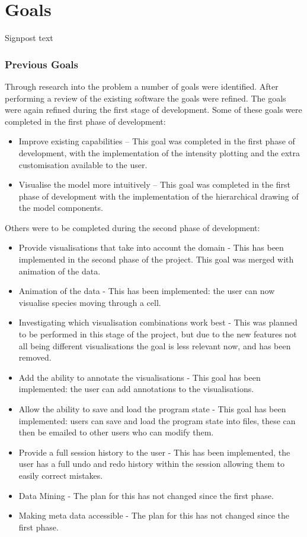\chapter{Goals}

Signpost text

\subsection{Previous Goals}
Through research into the problem a number of goals were identified.  After performing a review of the existing software the goals were refined.  The goals were again refined during the first stage of development.  Some of these goals were completed in the first phase of development:

\begin{itemize}
\item Improve existing capabilities -- This goal was completed in the first phase of development, with the implementation of the intensity plotting and the extra customisation available to the user.
\item Visualise the model more intuitively -- This goal was completed in the first phase of development with the implementation of the hierarchical drawing of the model components.
\end{itemize}

Others were to be completed during the second phase of development:

\begin{itemize}
\item Provide visualisations that take into account the domain - This has been implemented in the second phase of the project.  This goal was merged with animation of the data.
\item Animation of the data - This has been implemented: the user can now visualise species moving through a cell.
\item Investigating which visualisation combinations work best - This was planned to be performed in this stage of the project, but due to the new features not all being different visualisations the goal is less relevant now, and has been removed.
\item Add the ability to annotate the visualisations - This goal has been implemented: the user can add annotations to the visualisations.
\item Allow the ability to save and load the program state - This goal has been implemented: users can save and load the program state into files, these can then be emailed to other users who can modify them.
\item Provide a full session history to the user - This has been implemented, the user has a full undo and redo history within the session allowing them to easily correct mistakes.
\item Data Mining - The plan for this has not changed since the first phase.
\item Making meta data accessible - The plan for this has not changed since the first phase.
\end{itemize}

